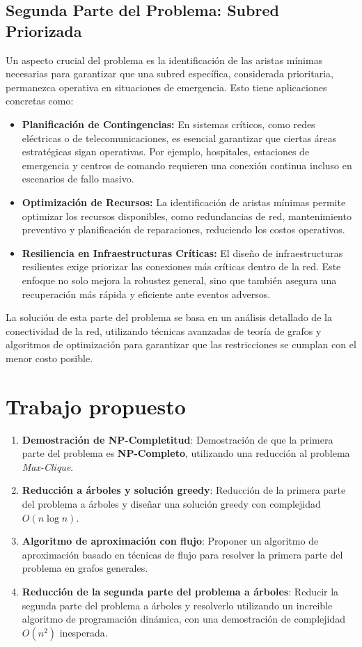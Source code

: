 \documentclass[a4paper, 12pt]{article}
\begin{document}
\subsection{Segunda Parte del Problema: Subred Priorizada}
Un aspecto crucial del problema es la identificación de las aristas mínimas necesarias para garantizar que una subred específica, considerada prioritaria, permanezca operativa en situaciones de emergencia. Esto tiene aplicaciones concretas como:
\begin{itemize}
    \item \textbf{Planificación de Contingencias:} En sistemas críticos, como redes eléctricas o de telecomunicaciones, es esencial garantizar que ciertas áreas estratégicas sigan operativas. Por ejemplo, hospitales, estaciones de emergencia y centros de comando requieren una conexión continua incluso en escenarios de fallo masivo.
    \item \textbf{Optimización de Recursos:} La identificación de aristas mínimas permite optimizar los recursos disponibles, como redundancias de red, mantenimiento preventivo y planificación de reparaciones, reduciendo los costos operativos.
    \item \textbf{Resiliencia en Infraestructuras Críticas:} El diseño de infraestructuras resilientes exige priorizar las conexiones más críticas dentro de la red. Este enfoque no solo mejora la robustez general, sino que también asegura una recuperación más rápida y eficiente ante eventos adversos.
\end{itemize}

La solución de esta parte del problema se basa en un análisis detallado de la conectividad de la red, utilizando técnicas avanzadas de teoría de grafos y algoritmos de optimización para garantizar que las restricciones se cumplan con el menor costo posible.


\section{Trabajo propuesto}
\begin{enumerate}
    \item \textbf{Demostración de NP-Completitud}: 
    Demostración de que la primera parte del problema es \textbf{NP-Completo}, utilizando una reducción al problema \textit{Max-Clique}.
    \item \textbf{Reducción a árboles y solución greedy}: 
    Reducción de la primera parte del problema a árboles y diseñar una solución greedy con complejidad \( O(n \log n) \).
    \item \textbf{Algoritmo de aproximación con flujo}: 
    Proponer un algoritmo de aproximación basado en técnicas de flujo para resolver la primera parte del problema en grafos generales.
    \item \textbf{Reducción de la segunda parte del problema a árboles}: 
    Reducir la segunda parte del problema a árboles y resolverlo utilizando un increible algoritmo de programación dinámica, con una demostración de complejidad \( O(n^2) \) inesperada.
\end{enumerate}
\end{document}
